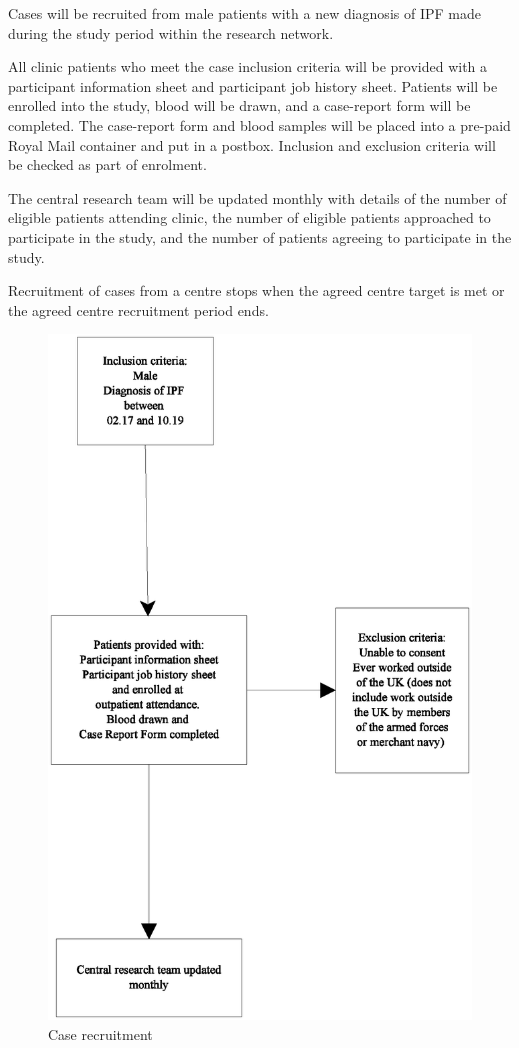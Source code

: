 \documentclass[a4paper,10pt]{article}
\begin{document}
Cases will be recruited from male patients with a new diagnosis of IPF made during the study period within the research network.

All clinic patients who meet the case inclusion criteria will be provided with a participant information sheet and participant job history sheet. Patients will be enrolled into the study, blood will be drawn, and a case-report form will be completed. The case-report form and blood samples will be placed into a pre-paid Royal Mail container and put in a postbox. Inclusion and exclusion criteria will be checked as part of enrolment. 

The central research team will be updated monthly with details of the number of eligible patients attending clinic, the number of eligible patients approached to participate in the study, and the number of patients agreeing to participate in the study.

Recruitment of cases from a centre stops when the agreed centre target is met or the agreed centre recruitment period ends.


\begin{figure}
\includegraphics[scale=0.8]{fig/case-recruitment.eps}
\caption{Case recruitment\label{fig:caserec}}
\end{figure}
\end{document}
